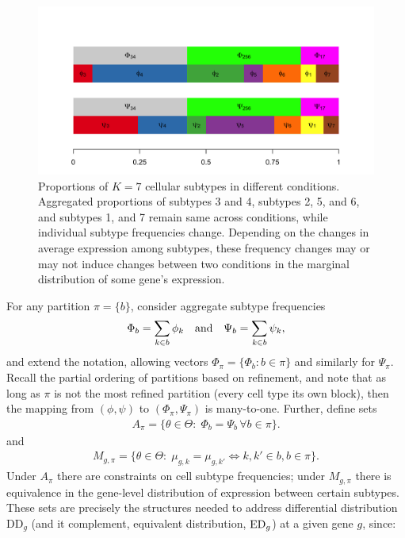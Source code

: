 \documentclass[aoas,preprint]{imsart}
\begin{document}
\begin{figure}[h!]
  \includegraphics[width=\linewidth]{Figs/schematic-1.png}
  \caption{Proportions of $K=7$ cellular subtypes in different conditions. 
 Aggregated proportions of subtypes 3 and 4, subtypes 2, 5, and 6, and subtypes 1, and 7 
 remain same across conditions, while individual subtype frequencies change. 
 Depending on the changes in average expression among subtypes, these frequency changes
may or may not induce changes between two conditions  in the  marginal distribution of some gene's expression.  }
  \label{fig:1}
\end{figure}



For any partition $\pi=\{b\}$, consider aggregate subtype frequencies
\begin{eqnarray*}
\Phi_b = \sum_{k\in b} \phi_k \quad {\mbox {\rm  and}} \quad 
 \Psi_b = \sum_{k\in b} \psi_k,
\end{eqnarray*}
and extend the notation, allowing vectors $\Phi_\pi = \{ \Phi_b: b \in \pi \}$ and similarly
for $\Psi_\pi$. Recall the partial ordering of partitions based on refinement, and note that
as long as $\pi$ is not the most refined partition (every cell type its own block),
then the mapping from $( \phi, \psi )$ to $( \Phi_\pi, \Psi_\pi)$ is many-to-one.
Further, define sets
\begin{eqnarray}
\label{eq:asets}
A_\pi = \{ \theta\in \Theta: \; \Phi_b = \Psi_b  \, \forall b \in \pi \}.
\end{eqnarray}
and
\begin{eqnarray}
\label{eq:msets}
M_{g,\pi} = \{ \theta \in \Theta: \; \mu_{g,k} = \mu_{g,k'} \iff k,k' \in b, b \in \pi \}.
\end{eqnarray}
Under $A_\pi$ there are constraints on cell subtype frequencies; under $M_{g,\pi}$ there is 
equivalence in the gene-level distribution of expression between certain subtypes.
These sets are precisely the
structures needed to address differential distribution DD$_g$ (and
it complement, equivalent distribution, ${\rm ED}_g$) at a given gene
$g$, since:
\end{document}
